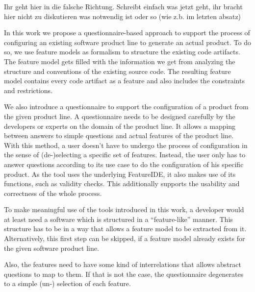 
{\color{red}Ihr geht hier in die falsche Richtung. Schreibt einfach was jetzt geht, ihr bracht hier nicht zu diskutieren was notwendig ist oder so (wie z.b. im letzten absatz)}

In this work we propose a questionnaire-based approach to support the process of configuring an existing software product line to generate an actual product. To do so, we use feature models as formalism to structure the existing code artifacts. The feature model gets filled with the information we get from analyzing the structure and conventions of the existing source code. The resulting feature model contains every code artifact as a feature and also includes the constraints and restrictions.

We also introduce a questionnaire to support the configuration of a product from the given product line. A questionnaire needs to be designed carefully by the developers or experts on the domain of the product line. It allows a mapping between answers to simple questions and actual features of the product line. With this method, a user doesn't have to undergo the process of configuration in the sense of \mbox{(de-)selecting} a specific set of features. Instead, the user only has to answer questions according to its use case to do the configuration of his specific product. As the tool uses the underlying FeatureIDE, it also makes use of its functions, such as validity checks. This additionally supports the usability and correctness of the whole process.


To make meaningful use of the tools introduced in this work, a developer would at least need a software which is structured in a ``feature-like'' manner. This structure has to be in a way that allows a feature model to be extracted from it. Alternatively, this first step can be skipped, if a feature model already exists for the given software product line.

Also, the features need to have some kind of interrelations that allows abstract questions to map to them. If that is not the case, the questionnaire degenerates to a simple (un-) selection of each feature.
